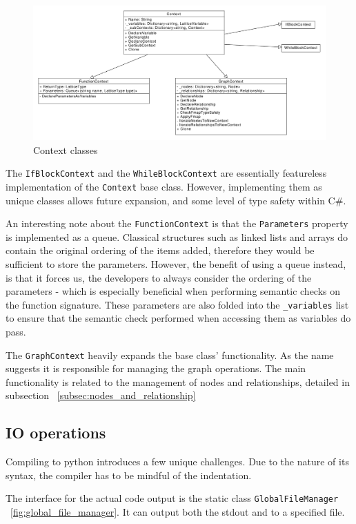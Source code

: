 \begin{figure}[H]
    \centering
    \includegraphics[width=12cm]{figures/implementation_section/contexts}
    \caption{Context classes}
    \label{fig:contexts}
\end{figure}

The \lstinline{IfBlockContext} and the \lstinline{WhileBlockContext} are essentially featureless implementation
of the \lstinline{Context} base class.
However, implementing them as unique classes allows future expansion, and some level of type safety within C#.

An interesting note about the \lstinline{FunctionContext} is that the \lstinline{Parameters} property is implemented
as a queue.
Classical structures such as linked lists and arrays do contain the original ordering of the items added,
therefore they would be sufficient to store the parameters.
However, the benefit of using a queue instead, is that it forces us, the developers to always consider the ordering of
the parameters - which is especially beneficial when performing semantic checks on the function signature.
These parameters are also folded into the \lstinline{_variables} list to ensure that the semantic check performed
when accessing them as variables do pass.

The \lstinline{GraphContext} heavily expands the base class' functionality.
As the name suggests it is responsible for managing the graph operations.
The main functionality is related to the management of nodes and relationships, detailed in subsection ~\ref{subsec:nodes_and_relationship}

\subsection{IO operations}
Compiling to python introduces a few unique challenges.
Due to the nature of its syntax, the compiler has to be mindful of the indentation.

The interface for the actual code output is the static class \lstinline{GlobalFileManager} ~\ref{fig:global_file_manager}.
It can output both the stdout and to a specified file.

